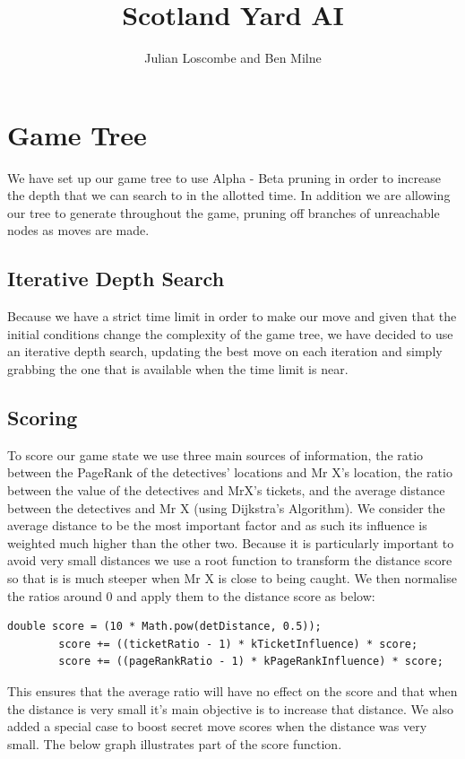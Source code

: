 \documentclass[a4paper, 12pt]{article}
\title{Scotland Yard AI}
\author{Julian Loscombe and Ben Milne}
\begin{document}
\maketitle
\section{Game Tree}
We have set up our game tree to use Alpha - Beta pruning in order to increase the depth that we can search to in the allotted time. In addition we are allowing our tree to generate throughout the game, pruning off branches of unreachable nodes as moves are made.
\subsection{Iterative Depth Search}
Because we have a strict time limit in order to make our move and given that the initial conditions change the complexity of the game tree, we have decided to use an iterative depth search, updating the best move on each iteration and simply grabbing the one that is available when the time limit is near.
\subsection{Scoring}
To score our game state we use three main sources of information, the ratio between the PageRank of the detectives' locations and Mr X's location, the ratio between the value of the detectives and MrX's tickets, and the average distance between the detectives and Mr X (using Dijkstra's Algorithm). We consider the average distance to be the most important factor and as such its influence is weighted much higher than the other two. Because it is particularly important to avoid very small distances we use a root function to transform the distance score so that is is much steeper when Mr X is close to being caught. We then normalise the ratios around 0 and apply them to the distance score as below:
\begin{lstlisting}
double score = (10 * Math.pow(detDistance, 0.5));
        score += ((ticketRatio - 1) * kTicketInfluence) * score;
        score += ((pageRankRatio - 1) * kPageRankInfluence) * score;
\end{lstlisting}
This ensures that the average ratio will have no effect on the score and that when the distance is very small it's main objective is to increase that distance. We also added a special case to boost secret move scores when the distance was very small. The below graph illustrates part of the score function.
\end{document}
